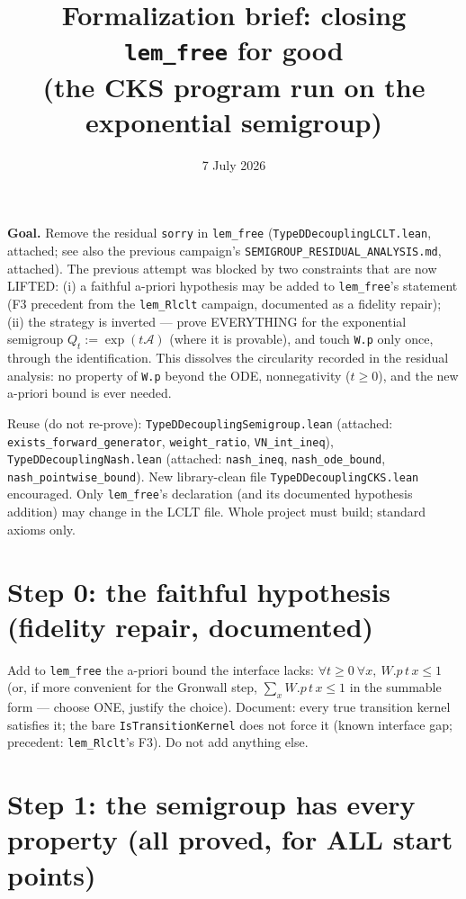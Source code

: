 \documentclass[11pt]{article}
\title{Formalization brief: closing \texttt{lem\_free} for good\\
(the CKS program run on the exponential semigroup)}
\date{7 July 2026}
\theoremstyle{plain}
\theoremstyle{remark}
\begin{document}
\maketitle

\noindent\textbf{Goal.} Remove the residual \texttt{sorry} in \texttt{lem\_free}
(\texttt{TypeDDecouplingLCLT.lean}, attached; see also the previous campaign's
\texttt{SEMIGROUP\_RESIDUAL\_ANALYSIS.md}, attached). The previous attempt was
blocked by two constraints that are now LIFTED: (i) a faithful a-priori
hypothesis may be added to \texttt{lem\_free}'s statement (F3 precedent from
the \texttt{lem\_Rlclt} campaign, documented as a fidelity repair); (ii) the
strategy is inverted --- prove EVERYTHING for the exponential semigroup
$Q_t:=\exp(t\mathcal A)$ (where it is provable), and touch \texttt{W.p} only
once, through the identification. This dissolves the circularity recorded in
the residual analysis: no property of \texttt{W.p} beyond the ODE, nonnegativity
($t\ge0$), and the new a-priori bound is ever needed.

Reuse (do not re-prove): \texttt{TypeDDecouplingSemigroup.lean} (attached:
\texttt{exists\_forward\_generator}, \texttt{weight\_ratio},
\texttt{VN\_int\_ineq}), \texttt{TypeDDecouplingNash.lean} (attached:
\texttt{nash\_ineq}, \texttt{nash\_ode\_bound},
\texttt{nash\_pointwise\_bound}). New library-clean file
\texttt{TypeDDecouplingCKS.lean} encouraged. Only \texttt{lem\_free}'s
declaration (and its documented hypothesis addition) may change in the LCLT
file. Whole project must build; standard axioms only.

\section*{Step 0: the faithful hypothesis (fidelity repair, documented)}

Add to \texttt{lem\_free} the a-priori bound the interface lacks:
$\forall t\ge0\ \forall x,\ W.p\,t\,x\le1$ (or, if more convenient for the
Gronwall step, $\sum_xW.p\,t\,x\le1$ in the summable form --- choose ONE,
justify the choice). Document: every true transition kernel satisfies it; the
bare \texttt{IsTransitionKernel} does not force it (known interface gap;
precedent: \texttt{lem\_Rlclt}'s F3). Do not add anything else.

\section*{Step 1: the semigroup has every property (all proved, for ALL
start points)}
\end{document}
